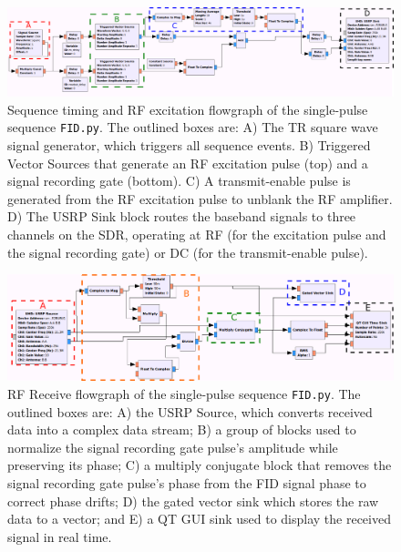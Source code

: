 \documentclass[10pt,letterpaper]{article}
\begin{document}
\begin{figure}[ht]
\begin{center}
\includegraphics[width = \textwidth,trim=0 0 0 0,clip=false]{fid_tx.png}
\caption{Sequence timing and RF excitation flowgraph of the single-pulse sequence \texttt{FID.py}.
The outlined boxes are: A) The TR square wave signal generator, which triggers all sequence events. 
B) Triggered Vector Sources that generate an RF excitation pulse (top) and a signal recording gate (bottom). 
C) A transmit-enable pulse is generated from the RF excitation pulse to unblank the RF amplifier.
D) The USRP Sink block routes the baseband signals to three channels on the SDR, operating at RF (for the excitation pulse and the signal recording gate) or DC (for the transmit-enable pulse).}
\label{fig:txflow}
\end{center}
\end{figure}

\begin{figure}[ht]
\begin{center}
\includegraphics[width = \textwidth,trim=0 0 0 0,clip=false]{fid_rx.png}
\caption{RF Receive flowgraph of the single-pulse sequence \texttt{FID.py}.  The outlined boxes are: A) the USRP
Source, which converts received data into a complex data stream; 
B) a group of blocks used to
normalize the signal recording gate pulse's amplitude while preserving its phase; 
C) a multiply conjugate block that removes the signal recording gate pulse's phase from the FID signal phase to correct phase drifts; 
D) the gated vector sink which stores the raw data to a vector; and E) a QT GUI sink used to display the received signal in real time.}
\label{fig:rxflow}
\end{center}
\end{figure}
\end{document}
